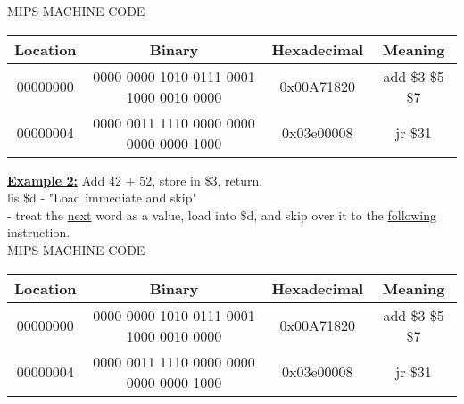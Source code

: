 \documentclass[12pt]{article}
\newcommand{\myt}[1]{\textbf{\underline{#1}}}
\begin{document}
	MIPS MACHINE CODE\\
	\begin{tabular}{c | c | c | c }
		Location & Binary & Hexadecimal & Meaning \\ \hline
		00000000 & 0000 0000 1010 0111 0001 1000 0010 0000 & 0x00A71820 & add \$3 \$5 \$7 \\ \hline
		00000004 & 0000 0011 1110 0000 0000 0000 0000 1000 & 0x03e00008 & jr \$31 \\ \hline
	\end{tabular}
	
	\myt{Example 2:} Add 42 + 52, store in \$3, return.\\
	lis \$d 
	- "Load immediate and skip"\\
	- treat the \underline{next} word as a value, load into \$d, and skip over it to the \underline{following} instruction.\\
	
	MIPS MACHINE CODE\\
	\begin{tabular}{c | c | c | c }
		Location & Binary & Hexadecimal & Meaning \\ \hline
		00000000 & 0000 0000 1010 0111 0001 1000 0010 0000 & 0x00A71820 & add \$3 \$5 \$7 \\ \hline
		00000004 & 0000 0011 1110 0000 0000 0000 0000 1000 & 0x03e00008 & jr \$31 \\ \hline
	\end{tabular}
	
	
	
\end{document}
